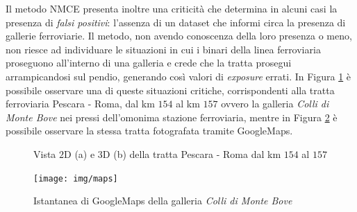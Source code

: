 Il metodo NMCE presenta inoltre una criticità che determina in alcuni casi la presenza di \textit{falsi positivi}: l'assenza di un dataset che informi circa la presenza di gallerie ferroviarie. Il metodo, non avendo conoscenza della loro presenza o meno, non riesce ad individuare le situazioni in cui i binari della linea ferroviaria proseguono all'interno di una galleria e crede che la tratta prosegui arrampicandosi sul pendio, generando così valori di \textit{exposure} errati.
In Figura \ref{esempiogalleria} è possibile osservare una di queste situazioni critiche, corrispondenti alla tratta ferroviaria Pescara - Roma, dal km $154$ al km $157$ ovvero la galleria \textit{Colli di Monte Bove} nei pressi dell'omonima stazione ferroviaria, mentre in Figura \ref{maps} è possibile osservare la stessa tratta fotografata tramite GoogleMaps.
\begin{figure}[bth]
\myfloatalign
{} \quad
{} 
\caption{ Vista $2$D (a) e $3$D (b) della tratta Pescara - Roma dal km $154$ al $157$}
\label{esempiogalleria}
\end{figure}
\begin{figure}[tbh]
	\centering
	\texttt{[image: img/maps]}
	\caption{Istantanea di GoogleMaps della galleria \textit{Colli di Monte Bove}}
	\label{maps}
\end{figure}
